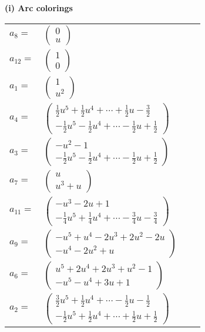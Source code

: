 \documentclass[1p]{elsarticle_modified}
\theoremstyle{definition}
\begin{document}
\flushleft \textbf{(i) Arc colorings}\\
\begin{tabular}{m{7pt} m{180pt} m{7pt} m{180pt} }
\flushright $a_{8}=$&$\begin{pmatrix}0\\u\end{pmatrix}$ \\
\flushright $a_{12}=$&$\begin{pmatrix}1\\0\end{pmatrix}$ \\
\flushright $a_{1}=$&$\begin{pmatrix}1\\u^2\end{pmatrix}$ \\
\flushright $a_{4}=$&$\begin{pmatrix}\frac{1}{2} u^5+\frac{1}{2} u^4+\cdots+\frac{1}{2} u-\frac{3}{2}\\-\frac{1}{2} u^5-\frac{1}{2} u^4+\cdots-\frac{1}{2} u+\frac{1}{2}\end{pmatrix}$ \\
\flushright $a_{3}=$&$\begin{pmatrix}- u^2-1\\-\frac{1}{2} u^5-\frac{1}{2} u^4+\cdots-\frac{1}{2} u+\frac{1}{2}\end{pmatrix}$ \\
\flushright $a_{7}=$&$\begin{pmatrix}u\\u^3+u\end{pmatrix}$ \\
\flushright $a_{11}=$&$\begin{pmatrix}- u^3-2 u+1\\-\frac{1}{4} u^5+\frac{1}{4} u^4+\cdots-\frac{3}{4} u-\frac{3}{4}\end{pmatrix}$ \\
\flushright $a_{9}=$&$\begin{pmatrix}- u^5+u^4-2 u^3+2 u^2-2 u\\- u^4-2 u^2+u\end{pmatrix}$ \\
\flushright $a_{6}=$&$\begin{pmatrix}u^5+2 u^4+2 u^3+u^2-1\\- u^5- u^4+3 u+1\end{pmatrix}$ \\
\flushright $a_{2}=$&$\begin{pmatrix}\frac{3}{2} u^5+\frac{1}{2} u^4+\cdots-\frac{1}{2} u-\frac{1}{2}\\-\frac{1}{2} u^5+\frac{1}{2} u^4+\cdots+\frac{1}{2} u+\frac{1}{2}\end{pmatrix}$ \\

\end{tabular}
\end{document}
